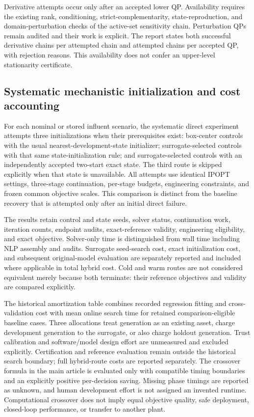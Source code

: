\documentclass[a4paper,fleqn]{cas-sc}
\begin{document}
Derivative attempts occur only after an accepted lower QP. Availability requires the existing rank, conditioning, strict-complementarity, state-reproduction, and domain-perturbation checks of the active-set sensitivity chain. Perturbation QPs remain audited and their work is explicit. The report states both successful derivative chains per attempted chain and attempted chains per accepted QP, with rejection reasons. This availability does not confer an upper-level stationarity certificate.

\subsection{Systematic mechanistic initialization and cost accounting}

For each nominal or stored influent scenario, the systematic direct experiment attempts three initializations when their prerequisites exist: box-center controls with the usual nearest-development-state initializer; surrogate-selected controls with that same state-initialization rule; and surrogate-selected controls with an independently accepted two-start exact state. The third route is skipped explicitly when that state is unavailable. All attempts use identical IPOPT settings, three-stage continuation, per-stage budgets, engineering constraints, and frozen common objective scales. This comparison is distinct from the baseline recovery that is attempted only after an initial direct failure.

The results retain control and state seeds, solver status, continuation work, iteration counts, endpoint audits, exact-reference validity, engineering eligibility, and exact objective. Solver-only time is distinguished from wall time including NLP assembly and audits. Surrogate seed-search cost, exact initialization cost, and subsequent original-model evaluation are separately reported and included where applicable in total hybrid cost. Cold and warm routes are not considered equivalent merely because both terminate: their reference objectives and validity are compared explicitly.

The historical amortization table combines recorded regression fitting and cross-validation cost with mean online search time for retained comparison-eligible baseline cases. Three allocations treat generation as an existing asset, charge development generation to the surrogate, or also charge holdout generation. Trust calibration and software/model design effort are unmeasured and excluded explicitly. Certification and reference evaluation remain outside the historical search boundary; full hybrid-route costs are reported separately. The crossover formula in the main article is evaluated only with compatible timing boundaries and an explicitly positive per-decision saving. Missing phase timings are reported as unknown, and human development effort is not assigned an invented runtime. Computational crossover does not imply equal objective quality, safe deployment, closed-loop performance, or transfer to another plant.
\end{document}
